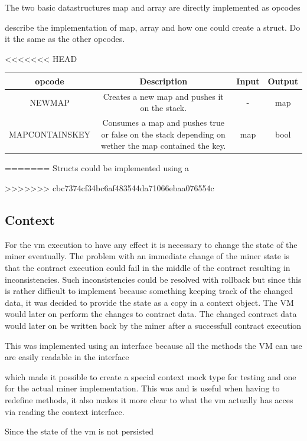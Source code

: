 The two basic datastructures map and array are directly implemented as opcodes



describe the implementation of map, array and how one could create a struct. Do it the same as the other opcodes.

<<<<<<< HEAD
\begin{tabular}[t]{ | c | c | c | c | }
\textbf{opcode} &
\textbf{Description} &
\textbf{Input} &
\textbf{Output} \\ \hline

NEWMAP &
Creates a new map and pushes it on the stack. &
- &
map \\ \hline

MAPCONTAINSKEY &
Consumes a map and pushes true or false on the stack depending on wether the map contained the key. &
map &
bool \\ \hline

\end{tabular}
=======
Structs could be implemented using a 


>>>>>>> cbc7374cf34bc6af483544da71066ebaa076554c

\subsection{Context}

For the vm execution to have any effect it is necessary to change the state of the miner eventually. The problem with an immediate change of the miner state is that the contract execution could fail in the middle of the contract resulting in inconsistencies. Such inconsistencies could be resolved with rollback but since this is rather difficult to implement because something keeping track of the changed data, it was decided to provide the state as a copy in a context object. The VM would later on perform the changes to contract data. The changed contract data would later on be written back by the miner after a successfull contract execution


This was implemented using an interface because all the methods the VM can use are easily readable in the interface 

which made it possible to create a special context mock type for testing and one for the actual miner implementation. This was and is useful when having to redefine methods, it also makes it more clear to what the vm actually has acces via reading the context interface. 


Since the state of the vm is not persisted 

